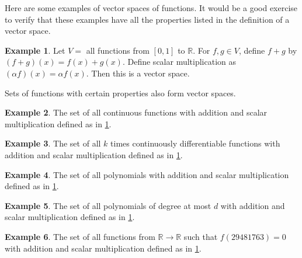 \documentclass[12pt,reqno]{amsart}
\def\R{\mathbb{R}}
\theoremstyle{definition}
\newtheorem{example}{Example}[section]
\begin{document}
Here are some examples of vector spaces of functions. It would be a good
exercise to verify that these examples have all the properties listed
in the definition of a vector space. 
\begin{example} \label{ex:funcSpace}
  Let $V = $ all functions from $[0,1]$ to $\R$. For $f, g \in V$,
  define $f + g$ by $(f+g)(x) = f(x) + g(x)$. Define scalar
  multiplication as $(\alpha f)(x) = \alpha f(x)$. Then this is a
  vector space. 
\end{example}
Sets of functions with certain properties also form vector spaces. 
\begin{example}
  The set of all continuous functions with addition and scalar
  multiplication defined as in \ref{ex:funcSpace}.
\end{example}
\begin{example}
  The set of all $k$ times continuously differentiable functions with
  addition and scalar multiplication defined as in \ref{ex:funcSpace}.
\end{example}
\begin{example}
  The set of all polynomials with addition and scalar
  multiplication defined as in \ref{ex:funcSpace}.
\end{example}
\begin{example} 
  The set of all polynomials of degree at most $d$ with addition and scalar
  multiplication defined as in \ref{ex:funcSpace}.
\end{example}
\begin{example}
  The set of all functions from $\R \to \R$ such that $f(29481763) =
  0$ with addition and scalar multiplication defined as in
  \ref{ex:funcSpace}.
\end{example}
\end{document}

